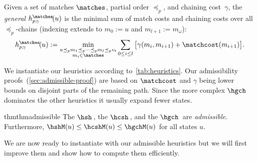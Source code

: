 \begin{definition}\label{dfn:h}
  Given a set of matches $\matches$, partial order $\preceq_p$, and chaining cost~$\gamma$,
  the \emph{general \csh} $h^\matches_{p,\!\gamma}\!(u)$
  is the minimal sum of match costs and chaining costs over all $\preceq_p$-chains
  (indexing extends to $m_0 := u$ and $m_{l+1}:=m_\omega$):
  \begin{equation*}
    h^\matches_{p,\!\gamma}\!(u) :=
        \min_{
          \substack{
            u \preceq_p m_1 \preceq_p \dots \preceq_p m_l \preceq_p v_t\\
            m_i \in \matches}
        }
        \sum_{0\leq i \leq l}
          \big[ \gamma(m_i, m_{i+1}) + \matchcost(m_{i+1}) \big].
    \label{eq:general_sh}
  \end{equation*}
\end{definition}



We instantiate our heuristics according to~\cref{tab:heuristics}. Our
admissibility proofs~(\cref{sec:admissible-proof}) are based on $\matchcost$ and
$\gamma$ being lower bounds on disjoint parts of the remaining path. Since the
more complex $\hgch$ dominates the other heuristics it usually expand fewer
states.

\begin{restatable}{thm}{thmadmissible}\label{thm:admissible} The \sh $\hsh$\,,
  the \csh $\hcsh$\,, and the \gch $\hgch$\, are \emph{admissible}. Furthermore,
  $\hshM(u) \leq \hcshM(u) \leq \hgchM(u)$ for all states $u$.
\end{restatable}

We are now ready to instantiate \A with our admissible heuristics but we will
first improve them and show how to compute them efficiently.
